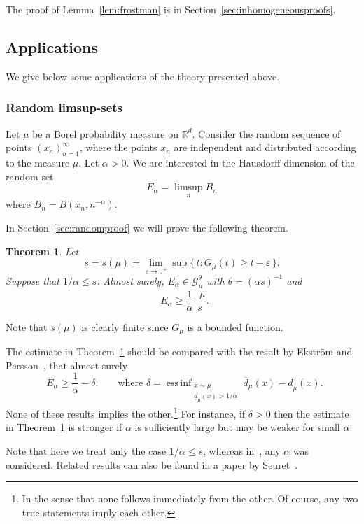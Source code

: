 \documentclass[10pt]{amsart}
\newtheorem{theo}{Theorem}[section]
\theoremstyle{definition}\newtheorem{defi}[theo]{Definition}\newtheorem{rema}[theo]{Remark}\newtheorem{exam}[theo]{Example}\newtheorem{exem}[theo]{Example}\newtheorem{nota}[theo]{Notation}
\DeclareMathOperator{\dimh}{dim_H}
\DeclareMathOperator{\udimh}{\overline{dim}_H}
\DeclareMathOperator*{\essinf}{ess\,inf}
\begin{document}
The proof of Lemma~\ref{lem:frostman} is in Section~\ref{sec:inhomogeneousproofs}.

\subsection{Applications} \label{sec:applications}

We give below some applications of the theory presented above.

\subsubsection{Random limsup-sets} \label{sec:random}

Let $\mu$ be a Borel probability measure on $\mathbb{R}^d$. Consider the random sequence of points $(x_n)_{n=1}^\infty$, where the points $x_n$ are independent and distributed according to the measure $\mu$. Let $\alpha > 0$. We are interested in the Hausdorff dimension of the random set
\[
E_\alpha = \limsup_n B_n
\]
where $B_n = B(x_n,n^{-\alpha})$.

In Section~\ref{sec:randomproof} we will prove the following theorem.


\begin{theo}\label{the:randomlimsup}
Let
\[
s = s (\mu) = \lim_{\varepsilon \to 0^+} \sup \{\, t : G_\mu (t)
\geq t - \varepsilon \,\}.
\]
Suppose that $1/\alpha \leq s$. Almost surely, $E_\alpha \in
\mathscr{G}_\mu^\theta$ with $\theta = (\alpha s)^{-1}$ and
\[
\dimh E_\alpha \geq \frac{1}{\alpha} \frac{\udimh \mu}{s}.
\]
\end{theo}


Note that $s (\mu)$ is clearly finite since $G_\mu$ is a bounded function.

The estimate in Theorem~\ref{the:randomlimsup} should be compared with the result by Ekstr\"om and Persson~\cite[Theorem~1]{ekstrompersson}, that almost surely
\[
\dimh E_\alpha \geq \frac{1}{\alpha} - \delta. \qquad \text{where }
\delta = \essinf_{\substack{x \sim \mu \\ \underline{d}_\mu (x) > 1 /
\alpha}} \overline{d}_\mu (x) - \underline{d}_\mu (x).
\]
None of these results implies the other.\footnote{In the sense that none follows immediately from the other. Of course, any two true statements imply each other.} For instance, if $\delta > 0$ then the estimate in Theorem~\ref{the:randomlimsup} is stronger if $\alpha$ is sufficiently large but may be weaker for small $\alpha$.

Note that here we treat only the case $1/\alpha \leq s$, whereas in~\cite{ekstrompersson}, any $\alpha$ was considered. Related results can also be found in a paper by Seuret~\cite{seuret}.
\end{document}

